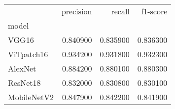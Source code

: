 \begin{tabular}{lrrr}
\toprule
 & precision & recall & f1-score \\
model &  &  &  \\
\midrule
VGG16 & 0.840900 & 0.835900 & 0.836300 \\
ViTpatch16 & 0.934200 & 0.931800 & 0.932300 \\
AlexNet & 0.884200 & 0.880100 & 0.880300 \\
ResNet18 & 0.832000 & 0.830800 & 0.830100 \\
MobileNetV2 & 0.847900 & 0.842200 & 0.841900 \\
\bottomrule
\end{tabular}
